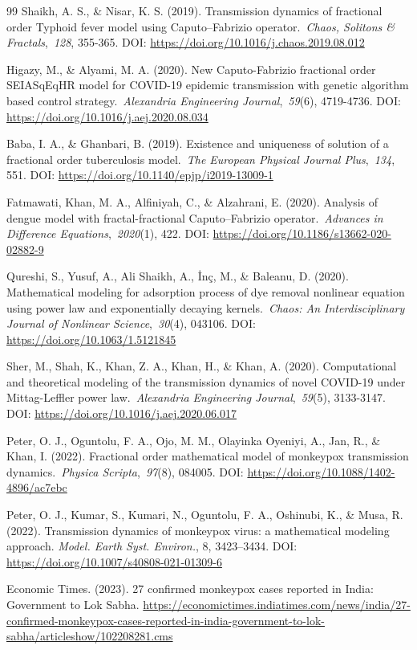 \documentclass[10pt]{NSP1}
\begin{document}
\begin{thebibliography}{99}
Shaikh, A. S., \& Nisar, K. S. (2019). Transmission dynamics of fractional order Typhoid fever model using Caputo--Fabrizio operator.~\emph{Chaos, Solitons \& Fractals},~\emph{128}, 355-365. DOI: \url{https://doi.org/10.1016/j.chaos.2019.08.012}

Higazy, M., \& Alyami, M. A. (2020). New Caputo-Fabrizio fractional order SEIASqEqHR model for COVID-19 epidemic transmission with genetic algorithm based control strategy.~\emph{Alexandria Engineering Journal},~\emph{59}(6), 4719-4736. DOI: \url{https://doi.org/10.1016/j.aej.2020.08.034}

Baba, I. A., \& Ghanbari, B. (2019). Existence and uniqueness of solution of a fractional order tuberculosis model.~\emph{The European Physical Journal Plus},~\emph{134}, 551. DOI: \url{https://doi.org/10.1140/epjp/i2019-13009-1}

Fatmawati, Khan, M. A., Alfiniyah, C., \& Alzahrani, E. (2020). Analysis of dengue model with fractal-fractional Caputo--Fabrizio operator.~\emph{Advances in Difference Equations},~\emph{2020}(1), 422. DOI: \url{https://doi.org/10.1186/s13662-020-02882-9}

Qureshi, S., Yusuf, A., Ali Shaikh, A., İnç, M., \& Baleanu, D. (2020). Mathematical modeling for adsorption process of dye removal nonlinear equation using power law and exponentially decaying kernels.~\emph{Chaos: An Interdisciplinary Journal of Nonlinear Science},~\emph{30}(4), 043106. DOI: \url{https://doi.org/10.1063/1.5121845}

Sher, M., Shah, K., Khan, Z. A., Khan, H., \& Khan, A. (2020). Computational and theoretical modeling of the transmission dynamics of novel COVID-19 under Mittag-Leffler power law.~\emph{Alexandria Engineering Journal},~\emph{59}(5), 3133-3147. DOI: \url{https://doi.org/10.1016/j.aej.2020.06.017}

Peter, O. J., Oguntolu, F. A., Ojo, M. M., Olayinka Oyeniyi, A., Jan, R., \& Khan, I. (2022). Fractional order mathematical model of monkeypox transmission dynamics.~\emph{Physica Scripta},~\emph{97}(8), 084005. DOI: \url{https://doi.org/10.1088/1402-4896/ac7ebc}

Peter, O. J., Kumar, S., Kumari, N., Oguntolu, F. A., Oshinubi, K., \& Musa, R. (2022). Transmission dynamics of monkeypox virus: a mathematical modeling approach. \emph{Model. Earth Syst. Environ.}, 8, 3423--3434. DOI: \url{https://doi.org/10.1007/s40808-021-01309-6}

Economic Times. (2023). 27 confirmed monkeypox cases reported in India: Government to Lok Sabha. \url{https://economictimes.indiatimes.com/news/india/27-confirmed-monkeypox-cases-reported-in-india-government-to-lok-sabha/articleshow/102208281.cms}

\end{thebibliography}
\end{document}
